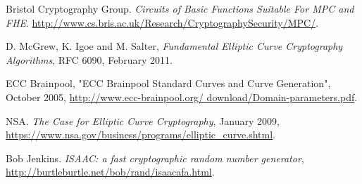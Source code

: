 \documentclass[ %
                    author={Nicholas Tutte},
                supervisor={Prof. Nigel Smart},
                    degree={MEng},
                     title={Secure Two Party Computation},
                  subtitle={A practical comparison of recent protocols},
                      type={Research - GG1K},
                      year={2015} ]{dissertation}
\begin{document}
\begin{thebibliography}{99}
			Bristol Cryptography Group. \emph{Circuits of Basic Functions Suitable For MPC and FHE}.  \url{http://www.cs.bris.ac.uk/Research/CryptographySecurity/MPC/}. 

			D. McGrew, K. Igoe and M. Salter,\emph{ Fundamental Elliptic Curve Cryptography Algorithms}, RFC 6090, February 2011.

			ECC Brainpool, "ECC Brainpool Standard Curves and Curve
			Generation", October 2005, \url{http://www.ecc-brainpool.org/
			download/Domain-parameters.pdf}.

			NSA. \emph{The Case for Elliptic Curve Cryptography}, January 2009,
			\url{https://www.nsa.gov/business/programs/elliptic_curve.shtml}.
			
			Bob Jenkins. \emph{ISAAC: a fast cryptographic random number generator},
			\url{http://burtleburtle.net/bob/rand/isaacafa.html}.
			
	\end{thebibliography}
\end{document}

